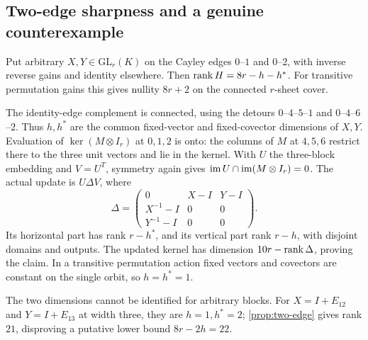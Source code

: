 \subsection{Two-edge sharpness and a genuine counterexample}
\begin{proposition}\label{prop:two-edge}
\notformalized
Put arbitrary $X,Y\in\mathrm{GL}_r(K)$ on the Cayley edges $0$--$1$
and $0$--$2$, with inverse reverse gains and identity elsewhere. Then
$\operatorname{rank} H=8r-h-h^*$. For transitive permutation gains this gives
nullity $8r+2$ on the connected $r$-sheet cover.
\end{proposition}
\begin{informalproof}
The identity-edge complement is connected, using the detours
$0$--$4$--$5$--$1$ and $0$--$4$--$6$--$2$. Thus $h,h^*$ are the
common fixed-vector and fixed-covector dimensions of $X,Y$.
Evaluation of $\ker(M\otimes I_r)$ at $0,1,2$ is onto: the columns
of $M$ at $4,5,6$ restrict there to the three unit vectors and lie
in the kernel. With $U$ the three-block embedding and $V=U^T$,
symmetry again gives $\operatorname{im} U\cap\operatorname{im}(M\otimes I_r)=0$.
The actual update is $U\Delta V$, where
\[
 \Delta=\begin{pmatrix}
 0&X-I&Y-I\\X^{-1}-I&0&0\\Y^{-1}-I&0&0
 \end{pmatrix}.
\]
Its horizontal part has rank $r-h^*$, and its vertical part rank
$r-h$, with disjoint domains and outputs. The updated kernel has
dimension $10r-\operatorname{rank}\Delta$, proving the claim. In a transitive
permutation action fixed vectors and covectors are constant on the
single orbit, so $h=h^*=1$.
\end{informalproof}

The two dimensions cannot be identified for arbitrary blocks. For
$X=I+E_{12}$ and $Y=I+E_{13}$ at width three, they are $h=1,h^*=2$;
\cref{prop:two-edge} gives rank $21$, disproving a putative lower
bound $8r-2h=22$.

